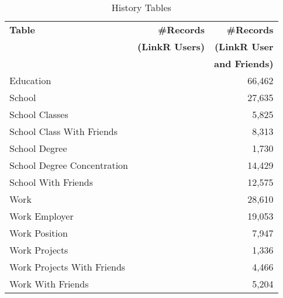\documentclass[letterpaper]{article}
\begin{document}
\begin{table}
\centering
\caption{\small History Tables}
\label{tab:history}
\begin{tabular}{|>{\small}p{2cm}|>{\small}r|>{\small}r|}
\hline
\textbf{Table} & \textbf{\#Records} & \textbf{\#Records} \\
& \textbf{(LinkR Users)} & \textbf{(LinkR User} \\
& & \textbf{and Friends)} \\
\hline
Education &  & 66,462 \\
\hline
School &  & 27,635 \\
\hline
School Classes &  & 5,825 \\
\hline
School Class With Friends &  & 8,313 \\
\hline
School Degree &  & 1,730 \\
\hline
School Degree Concentration &  & 14,429 \\
\hline
School With Friends &  & 12,575 \\
\hline
Work &  & 28,610 \\
\hline
Work Employer &  & 19,053 \\
\hline
Work Position &  & 7,947 \\
\hline
Work Projects &  & 1,336 \\
\hline
Work Projects With Friends &  & 4,466 \\
\hline
Work With Friends &  & 5,204 \\
\hline
\end{tabular}
\end{table}
\end{document}
